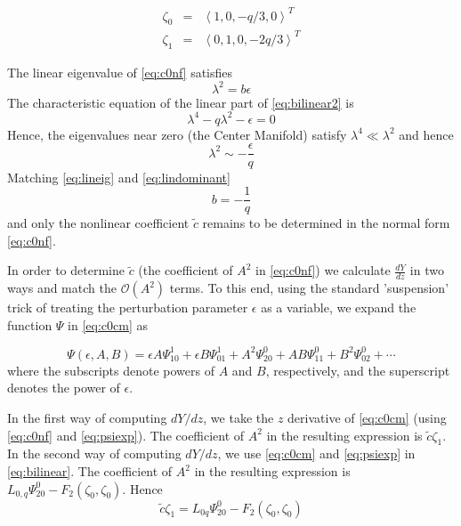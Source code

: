 \begin{subequations}\label{eq:lineareigs}
\begin{eqnarray}
\zeta_0 &=& \left<1,0,-q/3,0\right>^T\\
\zeta_1 &=& \left<0,1,0,-2 q/3\right>^T 
\end{eqnarray}
\end{subequations}

The linear eigenvalue of \eqref{eq:c0nf} satisfies 
\begin{equation}\label{eq:lineig}
\lambda^2 = b \epsilon 
\end{equation}
The characteristic equation of the linear part of 
\eqref{eq:bilinear2} is 
\begin{equation}\label{eq:charlinear}
\lambda^4 - q \lambda^2 - \epsilon =  0 
\end{equation}
Hence, the eigenvalues near zero (the Center Manifold) satisfy $\lambda^4 \ll \lambda^2$ and hence 
\begin{equation}\label{eq:lindominant}
\lambda^2 \sim -\frac{\epsilon}{q}
\end{equation}
Matching \eqref{eq:lineig} and \eqref{eq:lindominant} 
\begin{equation}
b = - \frac{1}{q}
\end{equation}
and only the nonlinear coefficient $\tilde{c}$ remains to be determined in the normal form \eqref{eq:c0nf}.

In order to determine $\tilde{c}$ (the coefficient of $A^2$ in \eqref{eq:c0nf})
we calculate $\frac{dY}{dz}$ in two ways and match the $\mathcal{O}(A^2)$
terms.  To this end, using the standard 'suspension' trick of treating the
perturbation parameter $\epsilon$ as a variable, we expand the function $\Psi$
in \eqref{eq:c0cm} as 

\begin{equation}\label{eq:psiexp}
\Psi(\epsilon,A,B) = \epsilon A \Psi_{10}^1 + \epsilon B \Psi_{01}^1 + A^2 \Psi_{20}^0 + A B \Psi_{11}^0 + B^2 \Psi_{02}^0 + \cdots
\end{equation}
where the subscripts denote powers of $A$ and $B$, respectively, and the superscript denotes the power of $\epsilon$. 

In the first way of computing $dY/dz$, we take
the $z$ derivative of \eqref{eq:c0cm} (using \eqref{eq:c0nf} and \eqref{eq:psiexp}). 
The coefficient of $A^2$ in the resulting expression is $\tilde{c} \zeta_1 $. In the second way of computing $dY/dz$, we use \eqref{eq:c0cm} and \eqref{eq:psiexp} in \eqref{eq:bilinear}. The coefficient of $A^2$ in the resulting expression is 
$ L_{0,q} \Psi_{20}^0 - F_2\left(\zeta_0,\zeta_0\right)$.  Hence
\begin{equation}\label{eq:A2coef}
 \tilde{c} \zeta_1 = L_{0q} \Psi_{20}^0 - F_2(\zeta_0,\zeta_0) \end{equation}

